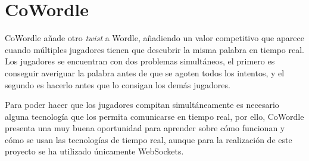 \section{CoWordle}

CoWordle añade otro \textit{twist} a Wordle, añadiendo un valor competitivo que aparece cuando múltiples jugadores tienen que descubrir la misma palabra en tiempo real. Los jugadores se encuentran con dos problemas simultáneos, el primero es conseguir averiguar la palabra antes de que se agoten todos los intentos, y el segundo es hacerlo antes que lo consigan los demás jugadores.

Para poder hacer que los jugadores compitan simultáneamente es necesario alguna tecnología que los permita comunicarse en tiempo real, por ello, CoWordle presenta una muy buena oportunidad para aprender sobre cómo funcionan y cómo se usan las tecnologías de tiempo real, aunque para la realización de este proyecto se ha utilizado únicamente WebSockets.
